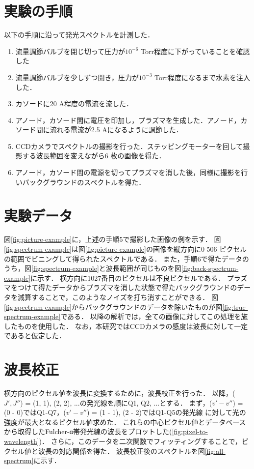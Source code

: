 \section{実験の手順}
以下の手順に沿って発光スペクトルを計測した．
\begin{enumerate}
    \item 流量調節バルブを閉じ切って圧力が$10^{-6}$ Torr程度に下がっていることを確認した
    \item 流量調節バルブを少しずつ開き，圧力が$10^{-3}$ Torr程度になるまで水素を注入した．
    \item カソードに20 A程度の電流を流した．
    \item アノード，カソード間に電圧を印加し，プラズマを生成した．アノード，カソード間に流れる電流が2.5 Aになるように調節した．
    \item CCDカメラでスペクトルの撮影を行った．ステッピングモーターを回して撮影する波長範囲を変えながら6 枚の画像を得た．
    \item アノード，カソード間の電源を切ってプラズマを消した後，同様に撮影を行いバックグラウンドのスペクトルを得た．
\end{enumerate}

\section{実験データ}
図\ref{fig:picture-example}に，上述の手順5で撮影した画像の例を示す．
図\ref{fig:spectrum-example}は図\ref{fig:picture-example}の画像を縦方向に0-506 ピクセルの範囲でビニングして得られたスペクトルである．
また，手順6で得たデータのうち，図\ref{fig:spectrum-example}と波長範囲が同じものを図\ref{fig:back-spectrum-example}に示す．
横方向に1027番目のピクセルは不良ピクセルである．
プラズマをつけて得たデータからプラズマを消した状態で得たバックグラウンドのデータを減算することで，このようなノイズを打ち消すことができる．
図\ref{fig:spectrum-example}からバックグラウンドのデータを除いたものが図\ref{fig:true-spectrum-example}である．
以降の解析では，全ての画像に対してこの処理を施したものを使用した．
なお，本研究ではCCDカメラの感度は波長に対して一定であると仮定した．

\section{波長校正}
横方向のピクセル値を波長に変換するために，波長校正を行った．
以降，($J', J''$) = (1, 1), (2, 2), ...の発光線を順にQ1, Q2, ...とする．
まず，($v'-v''$) = (0 - 0)ではQ1-Q7，($v'-v''$) = (1 - 1), (2 - 2)ではQ1-Q5の発光線
に対して光の強度が最大となるピクセル値求めた．
これらの中心ピクセル値とデータベース\cite{H2-spectrum-data}から取得したFulcher-α帯発光線の波長をプロットした(\ref{fig:pixel-to-wavelength})．
さらに，このデータを二次関数でフィッティングすることで，ピクセル値と波長の対応関係を得た．
波長校正後のスペクトルを図\ref{fig:all-spectrum}に示す．
